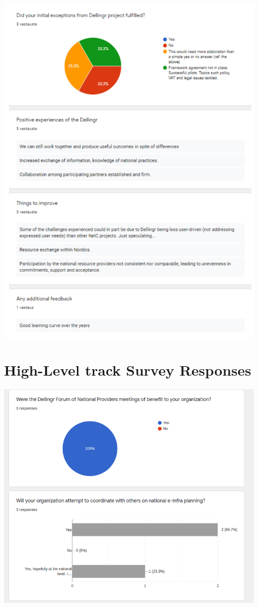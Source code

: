 \documentclass{article}
\newcommand{\HLT}{High-Level track\xspace}
\begin{document}
\begin{appendices}
\begin{center}
\includegraphics[scale=0.7]{SG_responses_2.pdf}
\end{center}

\section{\HLT Survey Responses}
\label{app:hlt-resp}

\begin{center}
\includegraphics[scale=0.6]{hlt_responses_1.png}
\end{center}


\end{appendices}
\end{document}
